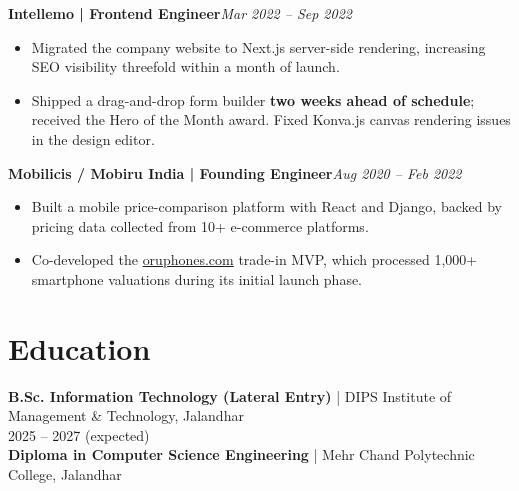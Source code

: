 \documentclass[a4paper,10pt]{article}
\newcommand{\job}[2]{\textbf{#1}\hfill\textit{#2}}
\begin{document}
\job{Intellemo | Frontend Engineer}{Mar 2022 -- Sep 2022}
\begin{itemize}
\item Migrated the company website to Next.js server-side rendering, increasing SEO visibility threefold within a month of launch.
\item Shipped a drag-and-drop form builder \textbf{two weeks ahead of schedule}; received the Hero of the Month award. Fixed Konva.js canvas rendering issues in the design editor.
\end{itemize}
\job{Mobilicis / Mobiru India | Founding Engineer}{Aug 2020 -- Feb 2022}
\begin{itemize}
\item Built a mobile price-comparison platform with React and Django, backed by pricing data collected from 10+ e-commerce platforms.
\item Co-developed the \href{https://www.oruphones.com}{oruphones.com} trade-in MVP, which processed 1,000+ smartphone valuations during its initial launch phase.
\end{itemize}
\section{Education}
\textbf{B.Sc. Information Technology (Lateral Entry)} | DIPS Institute of Management \& Technology, Jalandhar\\
2025 -- 2027 (expected)\\
\textbf{Diploma in Computer Science Engineering} | Mehr Chand Polytechnic College, Jalandhar
\end{document}
